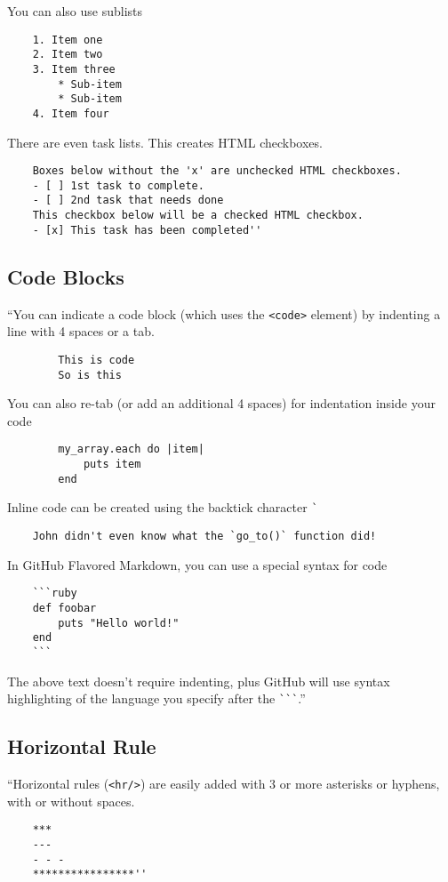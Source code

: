 \documentclass[oneside]{book}
\numberwithin{equation}{section}
\begin{document}
You can also use sublists
\begin{verbatim}
	1. Item one
	2. Item two
	3. Item three
	    * Sub-item
	    * Sub-item
	4. Item four
\end{verbatim}
There are even task lists. This creates HTML checkboxes.
\begin{verbatim}
	Boxes below without the 'x' are unchecked HTML checkboxes.
	- [ ] 1st task to complete.
	- [ ] 2nd task that needs done
	This checkbox below will be a checked HTML checkbox.
	- [x] This task has been completed''
\end{verbatim}

\subsection{Code Blocks}
``You can indicate a code block (which uses the \verb|<code>| element) by indenting a line with 4 spaces or a tab.
\begin{verbatim}
	    This is code
	    So is this
\end{verbatim}
You can also re-tab (or add an additional 4 spaces) for indentation inside your code
\begin{verbatim}
	    my_array.each do |item|
	        puts item
	    end
\end{verbatim}
Inline code can be created using the backtick character \verb|`|
\begin{verbatim}
	John didn't even know what the `go_to()` function did!
\end{verbatim}
In GitHub Flavored Markdown, you can use a special syntax for code
\begin{verbatim}
	```ruby
	def foobar
	    puts "Hello world!"
	end
	```
\end{verbatim}
The above text doesn't require indenting, plus GitHub will use syntax highlighting of the language you specify after the \verb|```|.''

\subsection{Horizontal Rule}
``Horizontal rules (\verb|<hr/>|) are easily added with 3 or more asterisks or hyphens, with or without spaces.
\begin{verbatim}
	***
	---
	- - -
	****************''
\end{verbatim}
\end{document}
